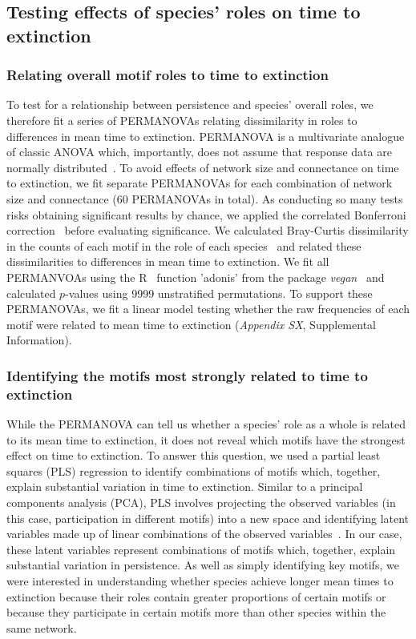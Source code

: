 \documentclass[12pt]{article}
\begin{document}
  \subsection*{Testing effects of species' roles on time to extinction}

    \subsubsection*{Relating overall motif roles to time to extinction}

      To test for a relationship between persistence and species' overall roles, we therefore fit a series of PERMANOVAs relating dissimilarity in roles to differences in mean time to extinction.
      PERMANOVA is a multivariate analogue of classic ANOVA which, importantly, does not assume that response data are normally distributed~\citep{Anderson2001}.
      To avoid effects of network size and connectance on time to extinction, we fit separate PERMANOVAs for each combination of network size and connectance (60 PERMANOVAs in total).
      As conducting so many tests risks obtaining significant results by chance, we applied the correlated Bonferroni correction~\citep{Drezner2016} before evaluating significance.
      We calculated Bray-Curtis dissimilarity in the counts of each motif in the role of each species~\citep{Baker2015,Cirtwill2015} and related these dissimilarities to differences in mean time to extinction.
      We fit all PERMANVOAs using the R~\citep{R} function 'adonis' from the package \emph{vegan}~\citep{vegan} and calculated $p$-values using 9999 unstratified permutations.
            To support these PERMANOVAs, we fit a linear model testing whether the raw frequencies of each motif were related to mean time to extinction (\emph{Appendix SX}, Supplemental Information).


    \subsubsection*{Identifying the motifs most strongly related to time to extinction}

      While the PERMANOVA can tell us whether a species' role as a whole is related to its mean time to extinction, it does not reveal which motifs have the strongest effect on time to extinction.
      To answer this question, we used a partial least squares (PLS) regression to identify combinations of motifs which, together, explain substantial variation in time to extinction. 
      Similar to a principal components analysis (PCA), PLS involves projecting the observed variables (in this case, participation in different motifs) into a new space and identifying latent variables made up of linear combinations of the observed variables~\citep{Mevik2007}.
      In our case, these latent variables represent combinations of motifs which, together, explain substantial variation in persistence.
      As well as simply identifying key motifs, we were interested in understanding whether species achieve longer mean times to extinction because their roles contain greater proportions of certain motifs or because they participate in certain motifs more than other species within the same network.
      
\end{document}
